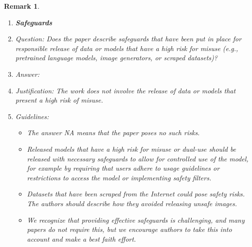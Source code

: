 \documentclass{article}
\newtheorem{remark}{Remark}
\begin{document}
\begin{remark}
\begin{enumerate}
\item {\bf Safeguards}
    \item[] Question: Does the paper describe safeguards that have been put in place for responsible release of data or models that have a high risk for misuse (e.g., pretrained language models, image generators, or scraped datasets)?
    \item[] Answer: \answerNA{}
    \item[] Justification: The work does not involve the release of data or models that present a high risk of misuse.
    \item[] Guidelines:
    \begin{itemize}
        \item The answer NA means that the paper poses no such risks.
        \item Released models that have a high risk for misuse or dual-use should be released with necessary safeguards to allow for controlled use of the model, for example by requiring that users adhere to usage guidelines or restrictions to access the model or implementing safety filters. 
        \item Datasets that have been scraped from the Internet could pose safety risks. The authors should describe how they avoided releasing unsafe images.
        \item We recognize that providing effective safeguards is challenging, and many papers do not require this, but we encourage authors to take this into account and make a best faith effort.
    \end{itemize}


\end{enumerate}
\end{remark}
\end{document}
